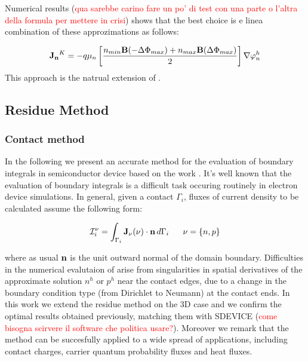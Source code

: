 Numerical results (\textcolor{red}{qua sarebbe carino fare un po' di test con una parte o l'altra della formula per mettere in crisi}) shows that the best choice is e linea combination of these approzimations as follows:

\begin{equation}
\label{eq: first formula for J}
\mathbf{J_n}^K = -  q \mu_n  \left[ \dfrac{ n_{min} \mathbf{B}(-\Delta \Phi_{max})  + n_{max}\mathbf{B}(\Delta \Phi_{max})}{2} \right]\nabla \varphi_n^h
\end{equation}
This approach is the natrual extension of .




\subsection{Residue Method}
\subsubsection{Contact method}
In the following we present an accurate method for the evaluation of boundary integrals in semiconductor device based on the work .
It's well known that the evaluation of boundary integrals is a difficult task occuring routinely in electron device simulations. In general, given a contact $\Gamma_i$, fluxes of current density to be calculated assume the following form:

\begin{equation}
\label{eq: current flux}
\mathcal{I}_i^\nu = \int_{\Gamma_i}\vect{J}_\nu(\nu) \cdot \vect{n} \, d{\Gamma_i} \psp{10} \nu = \{n,p\}
\end{equation}

where as usual $\mathbf{n}$ is the unit outward normal of the domain boundary. Difficulties in the numerical evalutaion of  arise from singularities in spatial derivatives of the approximate solution $n^h$ or $p^h$ near the contact edges, due to a change in the boundary condition type (from Dirichlet to Neumann) at the contact ends.
In this work we extend the residue method on the 3D case and we confirm the optimal results obtained previously, matching them with SDEVICE (\textcolor{red}{come bisogna scirvere il software che politica usare?}). Moreover we remark that the method can be succesfully applied to a wide spread of applications, including contact charges, carrier quantum probability fluxes and heat fluxes.

